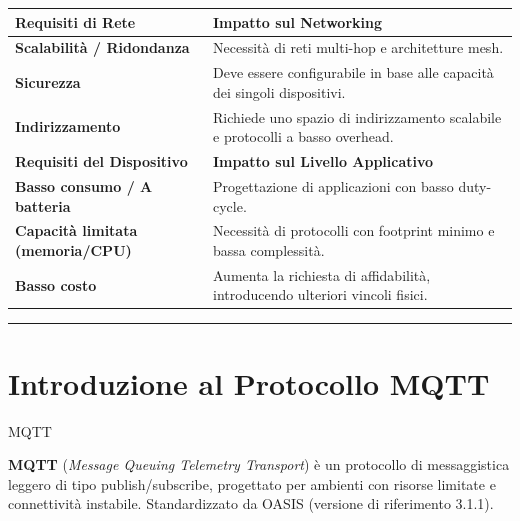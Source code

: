 \documentclass[
  italian,
  openany]{book}
\newcounter{none} %
\begin{document}
{\def\LTcaptype{none} %
\begin{longtable}[]{@{}
  >{\raggedright\arraybackslash}p{}
  >{\raggedright\arraybackslash}p{}@{}}
\toprule\noalign{}
\begin{minipage}[b]{\linewidth}\raggedright
Requisiti di Rete
\end{minipage} & \begin{minipage}[b]{\linewidth}\raggedright
Impatto sul Networking
\end{minipage} \\
\midrule\noalign{}
\endhead
\bottomrule\noalign{}
\endlastfoot
\textbf{Scalabilità / Ridondanza} & Necessità di reti multi-hop e
architetture mesh. \\
\textbf{Sicurezza} & Deve essere configurabile in base alle capacità dei
singoli dispositivi. \\
\textbf{Indirizzamento} & Richiede uno spazio di indirizzamento
scalabile e protocolli a basso overhead. \\
\textbf{Requisiti del Dispositivo} & \textbf{Impatto sul Livello
Applicativo} \\
\textbf{Basso consumo / A batteria} & Progettazione di applicazioni con
basso duty-cycle. \\
\textbf{Capacità limitata (memoria/CPU)} & Necessità di protocolli con
footprint minimo e bassa complessità. \\
\textbf{Basso costo} & Aumenta la richiesta di affidabilità,
introducendo ulteriori vincoli fisici. \\
\end{longtable}
}

\begin{center}\rule{0.5\linewidth}{0.5pt}\end{center}

\section{Introduzione al Protocollo
MQTT}\label{introduzione-al-protocollo-mqtt}

\begin{calloutdefinition}{MQTT}

\textbf{MQTT} (\emph{Message Queuing Telemetry Transport}) è un
protocollo di messaggistica leggero di tipo publish/subscribe,
progettato per ambienti con risorse limitate e connettività instabile.
Standardizzato da OASIS (versione di riferimento 3.1.1).

\end{calloutdefinition}
\end{document}
